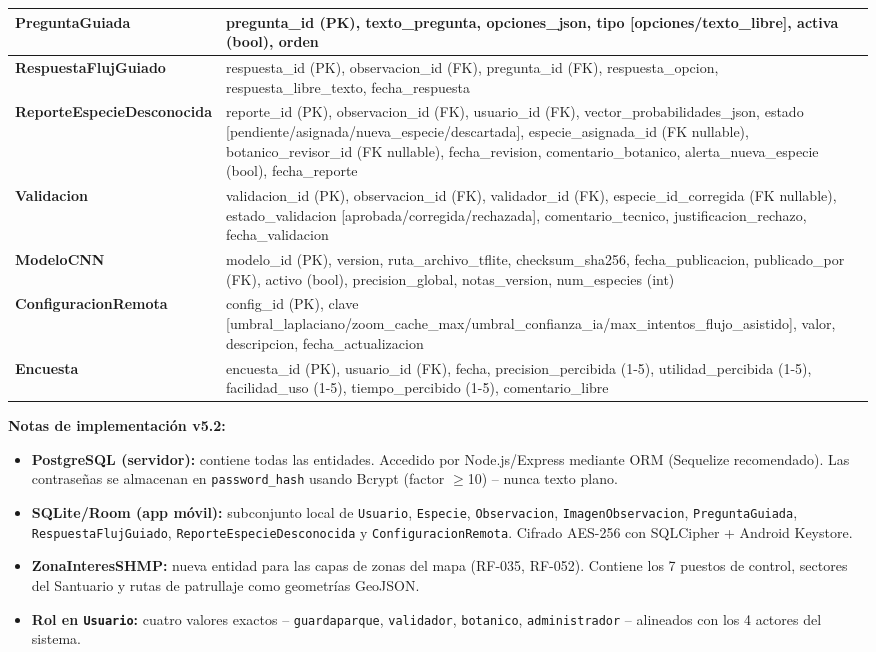 \documentclass[12pt, a4paper]{article}
\begin{document}
\begin{longtable}{|p{3.5cm}|p{11cm}|}
\hline
\textbf{PreguntaGuiada} & pregunta\_id (PK), texto\_pregunta, opciones\_json, tipo [opciones/texto\_libre], activa (bool), orden \\
\hline
\textbf{RespuestaFlujGuiado} & respuesta\_id (PK), observacion\_id (FK), pregunta\_id (FK), respuesta\_opcion, respuesta\_libre\_texto, fecha\_respuesta \\
\hline
\textbf{ReporteEspecieDesconocida} & reporte\_id (PK), observacion\_id (FK), usuario\_id (FK), vector\_probabilidades\_json, estado [pendiente/asignada/nueva\_especie/descartada], especie\_asignada\_id (FK nullable), botanico\_revisor\_id (FK nullable), fecha\_revision, comentario\_botanico, alerta\_nueva\_especie (bool), fecha\_reporte \\
\hline
\textbf{Validacion} & validacion\_id (PK), observacion\_id (FK), validador\_id (FK), especie\_id\_corregida (FK nullable), estado\_validacion [aprobada/corregida/rechazada], comentario\_tecnico, justificacion\_rechazo, fecha\_validacion \\
\hline
\textbf{ModeloCNN} & modelo\_id (PK), version, ruta\_archivo\_tflite, checksum\_sha256, fecha\_publicacion, publicado\_por (FK), activo (bool), precision\_global, notas\_version, num\_especies (int) \\
\hline
\textbf{ConfiguracionRemota} & config\_id (PK), clave [umbral\_laplaciano/zoom\_cache\_max/umbral\_confianza\_ia/max\_intentos\_flujo\_asistido], valor, descripcion, fecha\_actualizacion \\
\hline
\textbf{Encuesta} & encuesta\_id (PK), usuario\_id (FK), fecha, precision\_percibida (1-5), utilidad\_percibida (1-5), facilidad\_uso (1-5), tiempo\_percibido (1-5), comentario\_libre \\
\hline
\end{longtable}

\textbf{Notas de implementaci\'on v5.2:}
\begin{itemize}
  \item \textbf{PostgreSQL (servidor):} contiene todas las entidades. Accedido por Node.js/Express mediante ORM (Sequelize recomendado). Las contrase\~nas se almacenan en \texttt{password\_hash} usando Bcrypt (factor $\geq$10) -- nunca texto plano.
  \item \textbf{SQLite/Room (app m\'ovil):} subconjunto local de \texttt{Usuario}, \texttt{Especie}, \texttt{Observacion}, \texttt{ImagenObservacion}, \texttt{PreguntaGuiada}, \texttt{RespuestaFlujGuiado}, \texttt{ReporteEspecieDesconocida} y \texttt{ConfiguracionRemota}. Cifrado AES-256 con SQLCipher + Android Keystore.
  \item \textbf{ZonaInteresSHMP:} nueva entidad para las capas de zonas del mapa (RF-035, RF-052). Contiene los 7 puestos de control, sectores del Santuario y rutas de patrullaje como geometr\'ias GeoJSON.
  \item \textbf{Rol en \texttt{Usuario}:} cuatro valores exactos -- \texttt{guardaparque}, \texttt{validador}, \texttt{botanico}, \texttt{administrador} -- alineados con los 4 actores del sistema.
\end{itemize}
\end{document}
